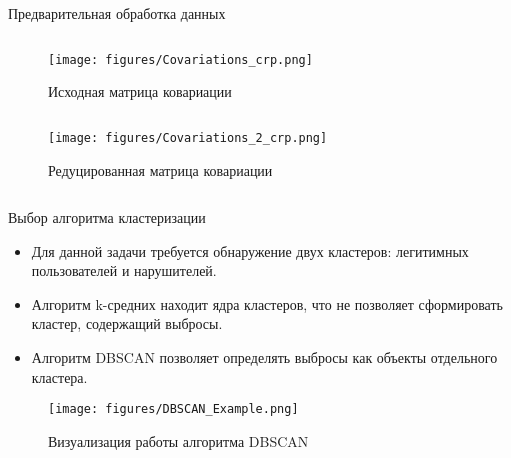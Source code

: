 \documentclass{beamer}
\begin{document}
\begin{frame}{Предварительная обработка данных}
    \begin{column}[T]{5cm}
        \centering
        \begin{figure}
            \texttt{[image: figures/Covariations\_crp.png]}
            \caption{\scriptsize Исходная матрица ковариации}
            \label{fig:f_s_tag}
        \end{figure}
    \end{column}
    \begin{column}[T]{5cm}
        \centering
        \begin{figure}
            \texttt{[image: figures/Covariations\_2\_crp.png]}
            \caption{\scriptsize Редуцированная матрица ковариации}
            \label{fig:f_s_tag}            
        \end{figure}
    \end{column}
\end{frame}


\begin{frame}{Выбор алгоритма кластеризации}
    \begin{itemize}
        \item Для данной задачи требуется обнаружение двух кластеров: легитимных пользователей и нарушителей.
        \item Алгоритм k-средних находит ядра кластеров, что не позволяет сформировать кластер, содержащий выбросы.
        \item Алгоритм DBSCAN позволяет определять выбросы как объекты отдельного кластера.
    \end{itemize}
    
    \begin{figure}
        \texttt{[image: figures/DBSCAN\_Example.png]}
        \caption{Визуализация работы алгоритма DBSCAN}
    \end{figure}
\end{frame}
\end{document}
